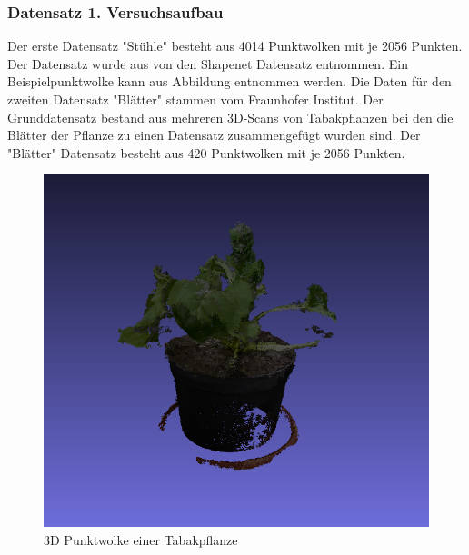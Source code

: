\documentclass{llncs}
\begin{document}
\subsubsection{Datensatz 1. Versuchsaufbau}
Der erste Datensatz "Stühle" besteht aus 4014 Punktwolken mit je 2056 Punkten. Der Datensatz wurde aus von den Shapenet Datensatz entnommen. Ein Beispielpunktwolke kann aus Abbildung entnommen werden. Die Daten für den zweiten Datensatz "Blätter" stammen vom Fraunhofer Institut. Der Grunddatensatz bestand aus mehreren 3D-Scans von Tabakpflanzen bei den die Blätter der Pflanze zu einen Datensatz zusammengefügt wurden sind. Der "Blätter" Datensatz besteht aus 420 Punktwolken mit je 2056 Punkten. 
\begin{figure}[htbp] 
	\centering
	\includegraphics[width=1.2\textwidth]{plant.png}
	\caption{3D Punktwolke einer Tabakpflanze}
	\label{fig:Bild2}
\end{figure}
\end{document}
